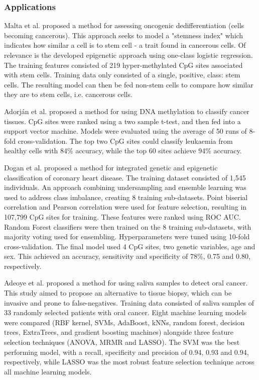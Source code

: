 \documentclass[draft]{article}
\begin{document}
\subsubsection{Applications} \label{sec:ml-examples}

Malta et al. \cite{malta2018machine} proposed a method for assessing oncogenic dedifferentiation (cells becoming cancerous). This approach seeks to model a "stemness index" which indicates how similar a cell is to stem cell - a trait found in cancerous cells. Of relevance is the developed epigenetic approach using one-class logistic regression. The training features consisted of 219 hyper-methylated CpG sites associated with stem cells. Training data only consisted of a single, positive, class: stem cells. The resulting model can then be fed non-stem cells to compare how similar they are to stem cells, i.e. cancerous cells.

Adorj\'an et al. \cite{adorjan2002tumour} proposed a method for using DNA methylation to classify cancer tissues. CpG sites were ranked using a two sample t-test, and then fed into a support vector machine. Models were evaluated using the average of 50 runs of 8-fold cross-validation. The top two CpG sites could classify leukaemia from healthy cells with 84\% accuracy, while the top 60 sites achieve 94\% accuracy.

Dogan et al. \cite{dogan2018integrated} proposed a method for integrated genetic and epigenetic classification of coronary heart disease. The training dataset consisted of 1,545 individuals. An approach combining undersampling and ensemble learning \cite{liu2008exploratory} was used to address class imbalance, creating 8 training sub-datasets. Point biserial correlation and Pearson correlation were used for feature selection, resulting in 107,799 CpG sites for training. These features were ranked using ROC AUC. Random Forest classifiers were then trained on the 8 training sub-datasets, with majority voting used for ensembling. Hyperparameters were tuned using 10-fold cross-validation. The final model used 4 CpG sites, two genetic variables, age and sex. This achieved an accuracy, sensitivity and specificity of 78\%, 0.75 and 0.80, respectively.

Adeoye et al. \cite{adeoye2022machine} proposed a method for using saliva samples to detect oral cancer. This study aimed to propose an alternative to tissue biopsy, which can be invasive and prone to false-negatives. Training data consisted of saliva samples of 33 randomly selected patients with oral cancer. Eight machine learning models were compared (RBF kernel, SVMs, AdaBoost, kNNs, random forest, decision trees, ExtraTrees, and gradient boosting machines) alongside three feature selection techniques (ANOVA, MRMR and LASSO). The SVM was the best performing model, with a recall, specificity and precision of 0.94, 0.93 and 0.94, respectively, while LASSO was the most robust feature selection technique across all machine learning models.
\end{document}
